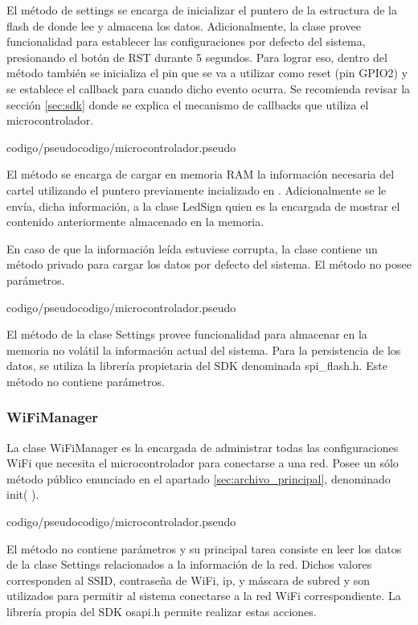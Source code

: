 El método  de settings se encarga de inicializar el puntero de la estructura de la flash de donde lee y almacena los datos.
Adicionalmente, la clase provee funcionalidad para establecer las configuraciones por defecto del sistema, presionando el botón de RST durante 5 segundos.
Para lograr eso, dentro del método  también se inicializa el pin que se va a utilizar como reset (pin GPIO2) y se establece el callback para cuando dicho evento ocurra.
Se recomienda revisar la sección \ref{sec:sdk} donde se explica el mecanismo de callbacks que utiliza el microcontrolador.

 {codigo/pseudocodigo/microcontrolador.pseudo}

El método  se encarga de cargar en memoria RAM la información necesaria del cartel utilizando el puntero previamente incializado en .
Adicionalmente se le envía, dicha información, a la clase LedSign quien es la encargada de mostrar el contenido anteriormente almacenado en la memoria.

En caso de que la información leída estuviese corrupta, la clase contiene un método privado para cargar los datos por defecto del sistema.
El método no posee parámetros.

 {codigo/pseudocodigo/microcontrolador.pseudo}

El método  de la clase Settings provee funcionalidad para almacenar en la memoria no volátil la información actual del sistema.
Para la persistencia de los datos, se utiliza la librería propietaria del SDK denominada spi\_flash.h.
Este método no contiene parámetros.


\subsubsection{WiFiManager}

La clase WiFiManager es la encargada de administrar todas las configuraciones WiFi que necesita el microcontrolador para conectarse a una red.
Posee un sólo método público enunciado en el apartado \ref{sec:archivo_principal}, denominado init( ).

 {codigo/pseudocodigo/microcontrolador.pseudo}

El método no contiene parámetros y su principal tarea consiste en leer los datos de la clase Settings relacionados a la información de la red.
Dichos valores corresponden al SSID, contraseña de WiFi, ip, y máscara de subred y son utilizados para permitir al sistema conectarse a la red WiFi correspondiente.
La librería propia del SDK osapi.h permite realizar estas acciones.



